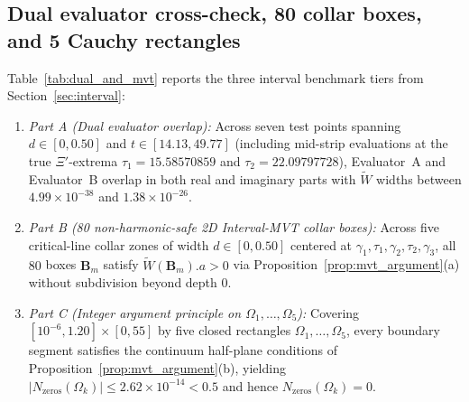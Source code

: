 \documentclass[11pt,a4paper,reqno]{amsart}
\theoremstyle{definition}
\theoremstyle{remark}
\numberwithin{equation}{section}
\newcommand{\Wtil}{\widetilde{W}}
\begin{document}
\subsection{Dual evaluator cross-check, 80 collar boxes, and 5 Cauchy rectangles}\label{subsec:num_mvt}

Table~\ref{tab:dual_and_mvt} reports the three interval benchmark tiers from Section~\ref{sec:interval}:
\begin{enumerate}
\item \emph{Part A (Dual evaluator overlap):} Across seven test points spanning $d \in [0, 0.50]$ and $t \in [14.13, 49.77]$ (including mid-strip evaluations at the true $\Xi'$-extrema $\tau_1 = 15.58570859$ and $\tau_2 = 22.09797728$), Evaluator~A and Evaluator~B overlap in both real and imaginary parts with $\Wtil$ widths between $4.99 \times 10^{-38}$ and $1.38 \times 10^{-26}$.
\item \emph{Part B (80 non-harmonic-safe 2D Interval-MVT collar boxes):} Across five critical-line collar zones of width $d \in [0, 0.50]$ centered at $\gamma_1, \tau_1, \gamma_2, \tau_2, \gamma_3$, all $80$ boxes $\mathbf{B}_m$ satisfy $\Wtil(\mathbf{B}_m).a > 0$ via Proposition~\ref{prop:mvt_argument}(a) without subdivision beyond depth $0$.
\item \emph{Part C (Integer argument principle on $\Omega_1, \dots, \Omega_5$):} Covering $[10^{-6}, 1.20] \times [0, 55]$ by five closed rectangles $\Omega_1, \dots, \Omega_5$, every boundary segment satisfies the continuum half-plane conditions of Proposition~\ref{prop:mvt_argument}(b), yielding $|N_{\mathrm{zeros}}(\Omega_k)| \le 2.62 \times 10^{-14} < 0.5$ and hence $N_{\mathrm{zeros}}(\Omega_k) = 0$.
\end{enumerate}
\end{document}
